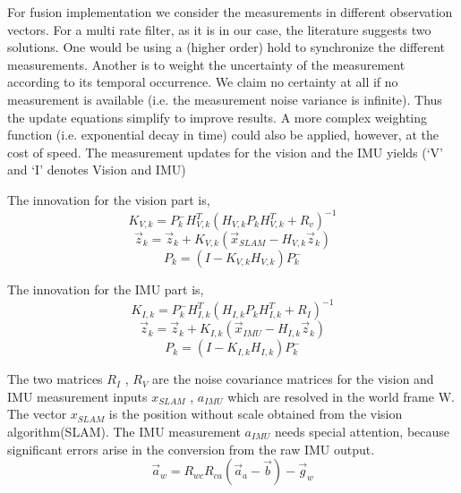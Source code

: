 For fusion implementation we consider the measurements in different observation
vectors. For a multi rate filter, as it is in our case, the literature suggests two solutions. One would be using a (higher order) hold to synchronize the different measurements. Another is to weight the uncertainty of the measurement according to its temporal occurrence. We claim no certainty at all if no
measurement is available (i.e. the measurement noise variance is infinite). Thus the update equations simplify to improve results. A more complex weighting function (i.e. exponential decay in time) could also be applied, however, at the cost of speed. The measurement updates for the vision and the IMU yields (‘V’ and ‘I’ denotes Vision and IMU)

The innovation for the vision part is,
\begin{equation}
K_{V,k}=P_k^- H_{V,k}^T (H_{V,k} P_k H_{V,k}^T +R_v)^{-1}
\end{equation}
\begin{equation}
\overrightarrow{z}_{k}=\overrightarrow{z}_{k}+K_{V,k}(\overrightarrow{x}_{SLAM}-H_{V,k} \overrightarrow{z}_{k})
\end{equation}
\begin{equation}
P_k=(I-K_{V,k} H_{V,k}) P_k^-
\end{equation}

The innovation for the IMU part is,
\begin{equation}
K_{I,k}=P_k^- H_{I,k}^T (H_{I,k} P_k H_{I,k}^T +R_I)^{-1}
\end{equation}
\begin{equation}
\overrightarrow{z}_{k}=\overrightarrow{z}_{k}+K_{I,k}(\overrightarrow{x}_{IMU}-H_{I,k} \overrightarrow{z}_{k})
\end{equation}
\begin{equation}
P_k=(I-K_{I,k} H_{I,k}) P_k^-
\end{equation}

The two matrices $R_I$ , $R_V$ are the noise covariance matrices for the vision and IMU measurement inputs $x_{SLAM}$ , $a_{IMU}$ which are resolved in the world frame W.
The vector $x_{SLAM}$ is the position without scale obtained from the vision algorithm(SLAM). The IMU measurement $a_{IMU}$ needs special attention, because significant errors arise in the conversion from the raw IMU output.
\begin{equation}
\overrightarrow{a}_{w}=R_{wc}R_{ca} (\overrightarrow{a}_a - \overrightarrow{b})-\overrightarrow{g}_w
\end{equation}

